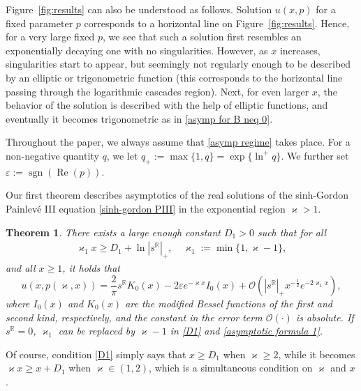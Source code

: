\documentclass[a4paper,10pt,leqno]{amsart}
\numberwithin{equation}{subsection}
\theoremstyle{plain}
\newtheorem{thm}{Theorem}[section]
\theoremstyle{definition}
\theoremstyle{remark}
\theoremstyle{case}
\newcommand{\R}{\mathbb R}
\DeclareMathOperator{\sign}{sgn}
\renewcommand{\O}{\mathcal{O}}
\renewcommand{\Re}{\operatorname{Re}}
\begin{document}
Figure~\ref{fig:results} can also be understood as follows. Solution \( u(x,p) \) for a fixed parameter \( p \) corresponds to a horizontal line on Figure~\ref{fig:results}. Hence, for a very large fixed \( p \), we see that such a solution first resembles an exponentially decaying one with no singularities. However, as \( x \) increases, singularities start to appear, but seemingly not regularly enough to be described by an elliptic or trigonometric function (this corresponds to the horizontal line passing through the logarithmic cascades region). Next, for even larger \( x \), the behavior of the solution is described with the help of elliptic functions, and eventually it becomes trigonometric as in \eqref{asymp for B neq 0}.

Throughout the paper, we always assume that \eqref{asymp regime} takes place. For a non-negative quantity \( q \), we let \( q_+:=\max\{1,q\} = \exp\{\ln^+q\} \). We further set \( \varepsilon :=\sign(\Re(p)) \).

Our first theorem describes asymptotics of the real solutions of the sinh-Gordon Painlev\'e III equation \eqref{sinh-gordon PIII} in the exponential region \( \varkappa>1 \).

\begin{tcolorbox}[colback=white,colframe=gray]
\begin{thm}
\label{thm:1}
There exists a large enough constant \( D_1>0 \) such that for all 
\begin{align}
\label{D1}
\varkappa_1 x \geq D_1 + \ln |s^\R|_+ , \quad \varkappa_1:=\min\{1,\varkappa-1\},
\end{align}
and all \( x\geq1 \), it holds that
\begin{equation}
\label{asymptotic formula 1}
u(x,p(\varkappa,x)) = \frac2\pi s^\R K_0(x) - 2\varepsilon e^{-\varkappa x} I_0(x) + \O\left(|s^\R|_+ x^{-\frac12}e^{-2\varkappa_1 x}\right),
\end{equation}
where \( I_0(x)\) and \( K_0(x) \) are the modified Bessel functions of the first and second kind, respectively, and the constant in the error term \( \O(\cdot) \) is absolute. If \( s^\R=0 \), \( \varkappa_1 \) can be replaced by \( \varkappa-1 \) in \eqref{D1} and \eqref{asymptotic formula 1}.
\end{thm}
\end{tcolorbox}

Of course, condition \eqref{D1} simply says that \( x\geq D_1\) when \( \varkappa\geq2 \), while it becomes \( \varkappa x\geq x+D_1 \) when \( \varkappa\in(1,2) \), which is a simultaneous condition on \( \varkappa \) and \( x \).
\end{document}
